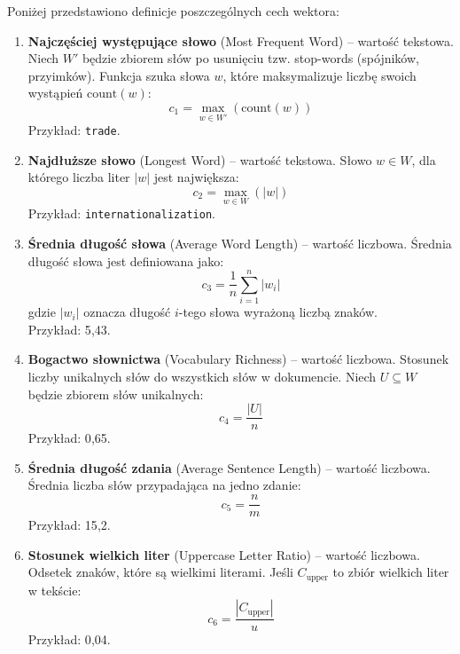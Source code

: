 \documentclass{article}
\begin{document}
Poniżej przedstawiono definicje poszczególnych cech wektora:

\begin{enumerate}
	\item \textbf{Najczęściej występujące słowo} (Most Frequent Word) – wartość tekstowa. Niech $W'$ będzie zbiorem słów po usunięciu tzw. stop-words (spójników, przyimków). Funkcja szuka słowa $w$, które maksymalizuje liczbę swoich wystąpień $\text{count}(w)$:
	\begin{equation}
	    c_1 = \max_{w \in W'} (\text{count}(w))
	\end{equation}
	Przykład: \texttt{trade}.

	\item \textbf{Najdłuższe słowo} (Longest Word) – wartość tekstowa. Słowo $w \in W$, dla którego liczba liter $|w|$ jest największa:
	\begin{equation}
	    c_2 = \max_{w \in W} (|w|)
	\end{equation}
	Przykład: \texttt{internationalization}.

    \item \textbf{Średnia długość słowa} (Average Word Length) – wartość liczbowa.
    Średnia długość słowa jest definiowana jako:
    \begin{equation}
        c_3 = \frac{1}{n} \sum_{i=1}^{n} |w_i|
    \end{equation}
    gdzie $|w_i|$ oznacza długość $i$-tego słowa wyrażoną liczbą znaków.\\
    Przykład: 5{,}43.

	\item \textbf{Bogactwo słownictwa} (Vocabulary Richness) – wartość liczbowa. Stosunek liczby unikalnych słów do wszystkich słów w dokumencie. Niech $U \subseteq W$ będzie zbiorem słów unikalnych:
	\begin{equation}
	    c_4 = \frac{|U|}{n}
	\end{equation}
	Przykład: 0{,}65.

	\item \textbf{Średnia długość zdania} (Average Sentence Length) – wartość liczbowa. Średnia liczba słów przypadająca na jedno zdanie:
	\begin{equation}
	    c_5 = \frac{n}{m}
	\end{equation}
	Przykład: 15{,}2.

	\item \textbf{Stosunek wielkich liter} (Uppercase Letter Ratio) – wartość liczbowa. Odsetek znaków, które są wielkimi literami. Jeśli $C_{\text{upper}}$ to zbiór wielkich liter w tekście:
	\begin{equation}
	    c_6 = \frac{|C_{\text{upper}}|}{u}
	\end{equation}
	Przykład: 0{,}04.


\end{enumerate}
\end{document}
